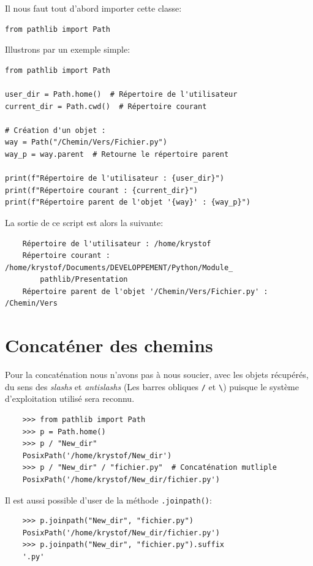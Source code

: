 \documentclass[a4paper,12pt]{book}
\begin{document}
Il nous faut tout d'abord importer cette classe:
\begin{lstlisting}[caption=Import de la classe \texttt{Path}]
from pathlib import Path
\end{lstlisting}
\medskip

Illustrons par un exemple simple:
\begin{lstlisting}[caption=Un premier script à l'aide du module \texttt{pathlib}]
from pathlib import Path

user_dir = Path.home()  # Répertoire de l'utilisateur
current_dir = Path.cwd()  # Répertoire courant

# Création d'un objet :
way = Path("/Chemin/Vers/Fichier.py")
way_p = way.parent  # Retourne le répertoire parent

print(f"Répertoire de l'utilisateur : {user_dir}")
print(f"Répertoire courant : {current_dir}")
print(f"Répertoire parent de l'objet '{way}' : {way_p}")
\end{lstlisting}
\medskip

La sortie de ce script est alors la suivante:
\begin{verbatim}
    Répertoire de l'utilisateur : /home/krystof
    Répertoire courant : /home/krystof/Documents/DEVELOPPEMENT/Python/Module_
        pathlib/Presentation
    Répertoire parent de l'objet '/Chemin/Vers/Fichier.py' : /Chemin/Vers
\end{verbatim}
\medskip

\section{Concaténer des chemins}
Pour la concaténation nous n'avons pas à nous soucier, avec les objets récupérés, du sens des \textit{slashs} et \textit{antislashs} (Les barres obliques \texttt{/} et \texttt{\textbackslash}) puisque le système d'exploitation utilisé sera reconnu.
\medskip
\begin{verbatim}
    >>> from pathlib import Path
    >>> p = Path.home()
    >>> p / "New_dir"
    PosixPath('/home/krystof/New_dir')
    >>> p / "New_dir" / "fichier.py"  # Concaténation mutliple
    PosixPath('/home/krystof/New_dir/fichier.py')
\end{verbatim}
\medskip

Il est aussi possible d'user de la méthode \texttt{.joinpath()}:
\begin{verbatim}
    >>> p.joinpath("New_dir", "fichier.py")
    PosixPath('/home/krystof/New_dir/fichier.py')
    >>> p.joinpath("New_dir", "fichier.py").suffix
    '.py'
\end{verbatim}
\medskip
\end{document}
